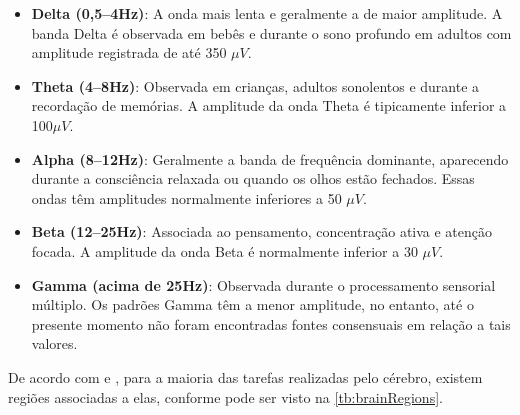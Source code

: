 			\begin{itemize}
				\item \textbf{Delta (0,5–4Hz)}: A onda mais lenta e geralmente a de maior amplitude. A banda Delta é observada em bebês e durante o sono profundo em adultos com amplitude registrada de até 350 $\mu V$.
				
				\item \textbf{Theta (4–8Hz)}: Observada em crianças, adultos sonolentos e durante a recordação de memórias. A amplitude da onda Theta é tipicamente inferior a 100$\mu V$.
				
				\item \textbf{Alpha (8–12Hz)}: Geralmente a banda de frequência dominante, aparecendo durante a consciência relaxada ou quando os olhos estão fechados. Essas ondas têm amplitudes normalmente inferiores a 50 $\mu V$.
				
				\item \textbf{Beta (12–25Hz)}: Associada ao pensamento, concentração ativa e atenção focada. A amplitude da onda Beta é normalmente inferior a 30 $\mu V$.
				
				\item \textbf{Gamma (acima de 25Hz)}: Observada durante o processamento sensorial múltiplo. Os padrões Gamma têm a menor amplitude, no entanto, até o presente momento não foram encontradas fontes consensuais em relação a tais valores.
				
			\end{itemize}
			
			
			\par De acordo com  e , para a maioria das tarefas realizadas pelo cérebro, existem regiões associadas a elas, conforme pode ser visto na \autoref{tb:brainRegions}.
			
